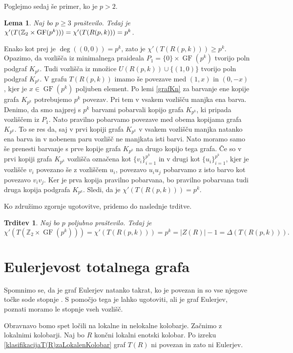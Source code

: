 \documentclass[a4paper, 12pt]{amsart}
\theoremstyle{definition} %
\theoremstyle{plain} %
\newtheorem{lema}[definicija]{Lema}
\newtheorem{trditev}[definicija]{Trditev}
\newcommand{\Z}{\mathbb Z}
\DeclareMathOperator{\GF}{GF}
\begin{document}
Poglejmo sedaj še primer, ko je $p> 2$.

\begin{lema}
Naj bo $p\ge 3$ praštevilo. Tedaj je $\chi'(T(\Z_2 \times \GF(p^k))) = \chi'(T(R(p,k))) \\= p^k$.
\end{lema}

\proof
Enako kot prej je $\deg((0,0)) = p^k$, zato je $\chi'(T(R(p,k))) \ge p^k$. Opazimo, da vozlišča iz minimalnega praideala $P_1 = \{0\} \times \GF(p^k)$ tvorijo poln podgraf $K_{p^k}$. Tudi vozlišča iz množice $U(R(p,k)) \cup \{(1,0)\}$ tvorijo poln podgraf $K_{p^k}$. V grafu $T(R(p,k))$ imamo še povezave med $(1,x)$ in $(0,-x)$, kjer je $x\in \GF(p^k)$ poljuben element. Po lemi \ref{grafKn} za barvanje ene kopije grafa $K_{p^k}$ potrebujemo $p^k$ povezav. Pri tem v vsakem vozlišču manjka ena barva. Denimo, da smo najprej s $p^k$ barvami pobarvali kopijo grafa $K_{p^k}$, ki pripada vozliščem iz $P_1$. Nato pravilno pobarvamo povezave med obema kopijama grafa $K_{p^k}$. To se res da, saj v prvi kopiji grafa $K_{p^k}$ v vsakem vozlišču manjka natanko ena barva in v nobenem paru vozlišč ne manjkata isti barvi. Nato moramo samo še prenesti barvanje s prve kopije grafa $K_{p^k}$ na drugo kopijo tega grafa. Če so v prvi kopiji grafa $K_{p^k}$ vozlišča označena kot $\{v_i\}_{i=1}^{p^k}$ in v drugi kot $\{u_i\}_{i=1}^{p^k}$, kjer je vozlišče $v_i$ povezano še z vozliščem $u_i$, povezavo $u_i u_j$ pobarvamo z isto barvo kot povezavo $v_i v_j$. Ker je prva kopija pravilno pobarvana, bo pravilno pobarvana tudi druga kopija podgrafa $K_{p^k}$. Sledi, da je $\chi'(T(R(p,k))) = p^k$.
\endproof

Ko združimo zgornje ugotovitve, pridemo do naslednje trditve.

\begin{trditev}
Naj bo $p$ poljubno praštevilo. Tedaj je 
$$
\chi'(T(\Z_2 \times \GF(p^k))) = \chi'(T(R(p,k))) = p^k = |Z(R)| - 1 = \Delta(T(R(p,k))).
$$
\end{trditev}

\section{Eulerjevost totalnega grafa}
Spomnimo se, da je graf Eulerjev natanko takrat, ko je povezan in so vse njegove točke sode stopnje \cite[Izrek 1.8.1]{Diestel}. S pomočjo tega je lahko ugotoviti, ali je graf Eulerjev, poznati moramo le stopnje vseh vozlišč. 

Obravnavo bomo spet ločili na lokalne in nelokalne kolobarje. Začnimo z lokalnimi kolobarji. Naj bo $R$ končni lokalni enotski kolobar. Po izreku  \ref{klasifikacijaT(R)zaLokalenKolobar} graf $T(R)$ ni povezan in zato ni Eulerjev. 
\end{document}

